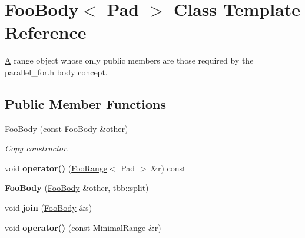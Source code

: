 \hypertarget{classFooBody}{}\section{Foo\+Body$<$ Pad $>$ Class Template Reference}
\label{classFooBody}


\hyperlink{structA}{A} range object whose only public members are those required by the parallel\+\_\+for.\+h body concept.  


\subsection*{Public Member Functions}
\begin{DoxyCompactItemize}
\item 
\hypertarget{classFooBody_ae9d44786ed32c9dc39933f04351440db}{}\hyperlink{classFooBody_ae9d44786ed32c9dc39933f04351440db}{Foo\+Body} (const \hyperlink{classFooBody}{Foo\+Body} \&other)\label{classFooBody_ae9d44786ed32c9dc39933f04351440db}

\begin{DoxyCompactList}\small\item\em Copy constructor. \end{DoxyCompactList}\item 
\hypertarget{classFooBody_a689fec2d505ff50be721ea7340941cba}{}void {\bfseries operator()} (\hyperlink{classFooRange}{Foo\+Range}$<$ Pad $>$ \&r) const \label{classFooBody_a689fec2d505ff50be721ea7340941cba}

\item 
\hypertarget{classFooBody_a2de1ae02f1546a2bbe32fb2b4ed10351}{}{\bfseries Foo\+Body} (\hyperlink{classFooBody}{Foo\+Body} \&other, tbb\+::split)\label{classFooBody_a2de1ae02f1546a2bbe32fb2b4ed10351}

\item 
\hypertarget{classFooBody_a5bb92a77079563401ce25ee79a61a851}{}void {\bfseries join} (\hyperlink{classFooBody}{Foo\+Body} \&s)\label{classFooBody_a5bb92a77079563401ce25ee79a61a851}

\item 
\hypertarget{classFooBody_ae8ec2276fc2e6e0b07247160710d3414}{}void {\bfseries operator()} (const \hyperlink{classMinimalRange}{Minimal\+Range} \&r)\label{classFooBody_ae8ec2276fc2e6e0b07247160710d3414}

\end{DoxyCompactItemize}

